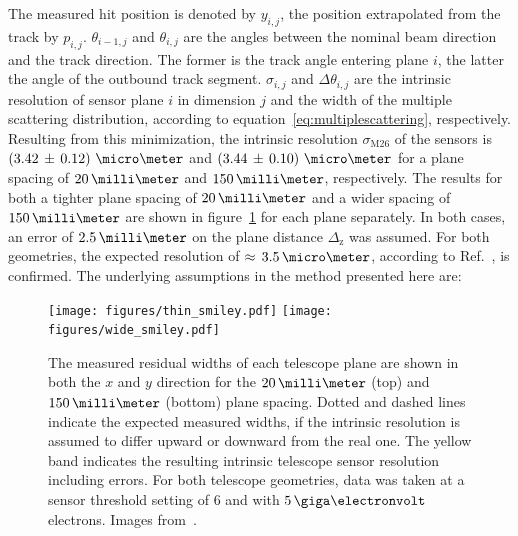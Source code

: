 \noindent The measured hit position is denoted by $y_{i,j}$, the position extrapolated from the track by $p_{i,j}$. $\theta_{i-1,j}$ and $\theta_{i,j}$ are the angles between the nominal beam direction
 and the track direction. The former is the track angle entering plane $i$, the latter the angle of the outbound track segment.
$\sigma_{i,j}$ and $\Delta \theta_{i,j}$ are the intrinsic resolution of sensor plane $i$ in dimension $j$ and the width of the multiple scattering distribution,
 according to equation~\ref{eq:multiplescattering}, respectively.
Resulting from this minimization, the intrinsic resolution $\sigma_{\textrm{M26}}$ of the \Mimosa sensors is \allowbreak$\left( 3.42\,\pm\, \allowbreak 0.12 \right)\,\micro\meter$
 and $\left( 3.44\,\pm\,0.10 \right)\,\micro\meter$ for a plane spacing of $20\,\milli\meter$ and $150\,\milli\meter$, respectively.
The results for both a tighter plane spacing of $20\,\milli\meter$ and a wider spacing of $150\,\milli\meter$ are shown in figure~\ref{fig:smiley} for each plane separately. 
In both cases, an error of $2.5\,\milli\meter$ on the plane distance $\Delta_{\textrm{z}}$ was assumed.
For both geometries, the expected resolution of $\approx\,3.5\,\micro\meter$, according to Ref.~\cite{ref:mimosa26}, is confirmed.
The underlying assumptions in the method presented here are:

\begin{figure}[tbp]
  \centering
  \texttt{[image: figures/thin\_smiley.pdf]}
  \texttt{[image: figures/wide\_smiley.pdf]}
  \caption[The measured residual widths of each telescope plane.]{The measured residual widths of each telescope plane are shown in both the $x$ and $y$ direction for the $20\,\milli\meter$ (top)
   and $150\,\milli\meter$ (bottom) plane spacing.
  Dotted and dashed lines indicate the expected measured widths, if the intrinsic resolution is assumed to differ upward or downward from the real one. 
  The yellow band indicates the resulting intrinsic telescope sensor resolution including errors.
  For both telescope geometries, data was taken at a sensor threshold setting of $6$ and with $5\,\giga\electronvolt$ electrons.
  Images from~\cite{ref:thomas}.}
  \label{fig:smiley}
\end{figure}



